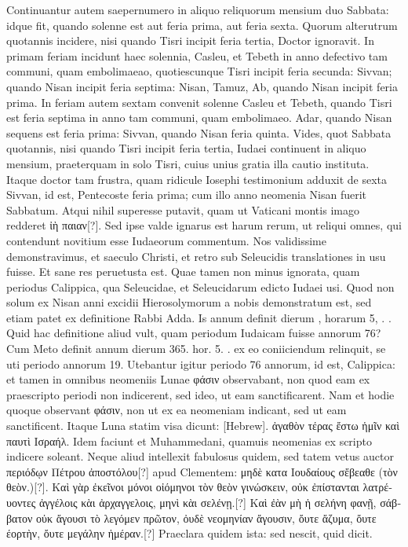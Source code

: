 Continuantur autem saepernumero in aliquo reliquorum mensium
duo Sabbata: idque fit, quando solenne est aut feria prima, aut feria
sexta.
Quorum alterutrum quotannis incidere, nisi quando Tisri
incipit feria tertia, Doctor ignoravit.
In primam feriam incidunt
haec solennia,  Casleu, et  Tebeth in anno defectivo tam
communi, quam embolimaeao, quotiescunque Tisri incipit feria secunda:
 Sivvan; quando Nisan incipit feria septima:
 Nisan,  Tamuz,
 Ab, quando Nisan incipit feria prima.
In feriam autem sextam
convenit solenne  Casleu et
  Tebeth, quando Tisri est feria
septima in anno tam communi, quam embolimaeo.
 Adar, quando
Nisan sequens est feria prima:  Sivvan, quando Nisan feria quinta.
Vides, quot Sabbata quotannis, nisi quando Tisri incipit
 feria tertia, Iudaei
continuent in aliquo mensium, praeterquam in solo Tisri, cuius
unius gratia illa cautio instituta.
Itaque doctor tam frustra, quam ridicule
Iosephi testimonium adduxit de sexta Sivvan, id est, Pentecoste
feria prima; cum illo anno neomenia Nisan fuerit Sabbatum.
Atqui
nihil superesse putavit, quam ut Vaticani montis imago redderet
\textgreek{ἰὴ παιαν[?]}.
Sed ipse valde ignarus est harum rerum, ut reliqui omnes,
qui contendunt novitium esse Iudaeorum commentum.
Nos
validissime demonstravimus, et saeculo Christi, et retro sub Seleucidis
translationes in usu fuisse.
Et sane res peruetusta est.
Quae tamen
non minus ignorata, quam periodus Calippica, qua Seleucidae, et
Seleucidarum edicto Iudaei usi.
Quod non solum ex Nisan anni excidii
Hierosolymorum a nobis demonstratum est, sed etiam patet
ex definitione Rabbi Adda.
Is annum definit dierum ,
horarum 5, . .
Quid hac definitione aliud vult, quam periodum
Iudaicam fuisse annorum 76?
Cum Meto definit annum dierum
365. hor. 5. . ex eo coniiciendum relinquit,
 se uti periodo annorum
19.
Utebantur igitur periodo 76 annorum, id est, Calippica:
et tamen in omnibus neomeniis Lunae \textgreek{φάσιν} observabant, non
quod eam ex praescripto periodi non indicerent, sed ideo, ut eam
sanctificarent.
Nam et hodie quoque observant \textgreek{φάσιν}, non ut ex ea
neomeniam indicant, sed ut eam sanctificent.
Itaque Luna statim
visa dicunt: \texthebrew{[Hebrew]}.
\textgreek{ἀγαθὸν τέρας ἔστω ἡμῖν καὶ παυτὶ Ισραήλ.}
Idem faciunt et Muhammedani, quamuis neomenias ex
scripto indicere soleant.
Neque aliud intellexit fabulosus quidem,
sed tatem vetus auctor \textgreek{περιόδῳν Πέτρου ἀποστόλου[?]} apud Clementem:
\textgreek{μηδὲ κατα Ιουδαίους σἔβεαθε (τὸν θεὸν.)[?]}.
\textgreek{Καὶ γὰρ ἐκεῖνοι μόνοι οἰόμηνοι τὸν θεὸν
γινώσκειν, οὐκ ἐπίστανται λατρέυοντες ἀγγέλοις κὰι ἀρχαγγελοις, μηνὶ κὰι σελένῃ.[?]}
\textgreek{Καὶ ἐὰν μὴ ἡ σελήνη φανῇ,
 σάββατον οὐκ ἄγουσι τὸ λεγόμεν πρῶτον, ὀυδὲ νεομηνίαν
ἄγουσιν, ὄυτε ἄζυμα, ὄυτε έορτὴν, ὄυτε μεγάλην ἡμέραν.[?]}
Praeclara quidem ista: sed nescit, quid dicit.

